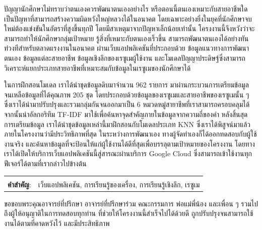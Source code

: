 \documentclass[12pt,oneside,openright,a4paper]{cpe-thai-project}
\begin{document}
\thaiabstract

ปัญญานักศึกษาไม่ทราบว่าตนเองควรพัฒนาตนเองอย่างไร หรือตอนนี้ตนเองเหมาะกับสายอาชีพใด เป็นปัญหาที่สามารถสร้างความผิดหวังใหญ่หลวงได้ในอนาคต
โดยเฉพาะอย่างยิ่งในยุคที่นักศึกษาจบใหม่ต้องแข่งขันในอัตราที่สูงขึ้นทุกปี โดยมีสาเหตุมาจากปัญหาเล็กน้อยเท่านั้น โครงงานนี้จึงหวังว่าจะสามารถทำให้นักศึกษากลุ่มเป้าหมาย
รู้สิ่งที่เหมาะกับตนเองเร็วขึ้น สามารถพัฒนาตนเองได้อย่างทันท่วงทีสำหรับตลาดแรงงานในอนาคต ผ่านเว็บแอปพลิเคชันที่ประกอบด้วย ข้อมูลแนวทางการพัฒนาตนเอง ข้อมูลแต่ละสายอาชีพ ข้อมูลเชิงลึกของเรซูเมผู้ใช้งาน
และโมเดลปัญญาประดิษฐ์ซึ่งสามารถวิเคราะห์แยกประเภทสายอาชีพที่เหมาะสมกับข้อมูลในเรซูเมของนักศึกษาได้

ในการฝึกสอนโมเดล เราได้นำชุดข้อมูลดิบมาจำนวน 962 รายการ มาผ่านกระบวนการเตรียมข้อมูล จนเหลือข้อมูลที่ได้คุณภาพ 205 ชุด โดยประกอบด้วยข้อมูลของเรซูเมและสายอาชีพของเรซูเมนั้น ๆ
ซึ่งเราได้นำมาปรับปรุงและรวมกลุ่มกันจนออกมาเป็น 6 หมวดหมู่สายาชีพที่เราสามารถครอบคลุมได้ จากนั้นนำอัลกอริทึม TF-IDF มาใช้เพื่อค้นหาจุดสำคัญภายในข้อมูลจากความถี่ของคำ
หลังสิ้นสุดการเตรียมข้อมูล เราได้นำชุดข้อมูลเหล่านี้มาฝึกสอนกับโมเดลประเภท KNN ซึ่งเราได้พิสูจน์มาแล้วภายในโครงงานว่ามีประวิทธิภาพที่สุด
ในระหว่างการพัฒนาเอง ทางผู้จัดทำเองก็ได้ออกทดสอบกับผู้ใช้งานจริง และค้นหาข้อมูลที่จะป้อนให้แก่ผู้ใช้งานได้ดีที่สุดเพื่อบรรลุตามเป้าหมายของโครงงาน
โดยทางเราได้เปิดให้บริการเว็บแอปพลิเคชันนี้สู่สารณะผ่านบริการ Google Cloud ซึ่งสามารถเข้าใช้งานทุกฟีเจอร์ได้ตามที่เรากล่าวไปข้างต้น

\begin{flushleft}
    \begin{tabular*}{\textwidth}{@{}lp{}}
        & \\

        \textbf{คำสำคัญ}: & เว็บแอปพลิเคชัน, การเรียนรู้ของเครื่อง, การเรียนรู้เชิงลึก, เรซูเม
    \end{tabular*}
\end{flushleft}
\endabstract


\preface
ขอขอบพระคุณอาจารย์ที่ปรึกษา อาจารย์ที่ปรึกษาร่วม คณะกรรมการ พ่อแม่พี่น้อง และเพื่อน ๆ รวมไปถึงผู้ให้อนุญาติในการทดสอบทุกท่าน
ที่ช่วยให้โครงงานนี้สำเร็จไปได้ด้วยดี ถูกปรับปรุงจนสามารถใช้งานได้ตามที่คาดหวังไว้ และมีประสิทธิภาพ
\end{document}
